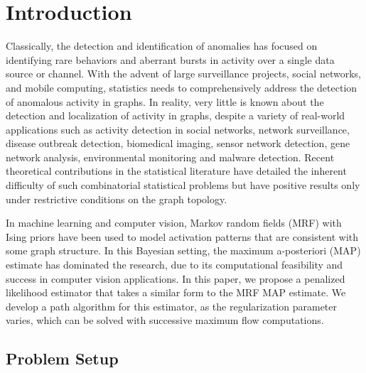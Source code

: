 \section{Introduction}

Classically, the detection and identification of anomalies has focused on identifying rare behaviors and aberrant bursts in activity over a single data source or channel.
With the advent of large surveillance projects, social networks, and mobile computing, statistics needs to comprehensively address the detection of anomalous activity in graphs.
In reality, very little is known about the detection and localization of activity in graphs, despite a variety of real-world applications such as activity detection in social networks, network surveillance, disease outbreak detection, biomedical imaging, sensor network detection, gene network analysis, environmental monitoring and malware detection.
Recent theoretical contributions in the statistical literature\cite{arias2011detection,addario2010combinatorial} have detailed the inherent difficulty of such combinatorial statistical problems but have positive results only under restrictive conditions on the graph topology.

In machine learning and computer vision, Markov random fields (MRF) with Ising priors have been used to model activation patterns that are consistent with some graph structure.
In this Bayesian setting, the maximum a-posteriori (MAP) estimate has dominated the research, due to its computational feasibility and success in computer vision applications.
In this paper, we propose a penalized likelihood estimator that takes a similar form to the MRF MAP estimate.
We develop a path algorithm for this estimator, as the regularization parameter varies, which can be solved with successive maximum flow computations.

\subsection{Problem Setup}

